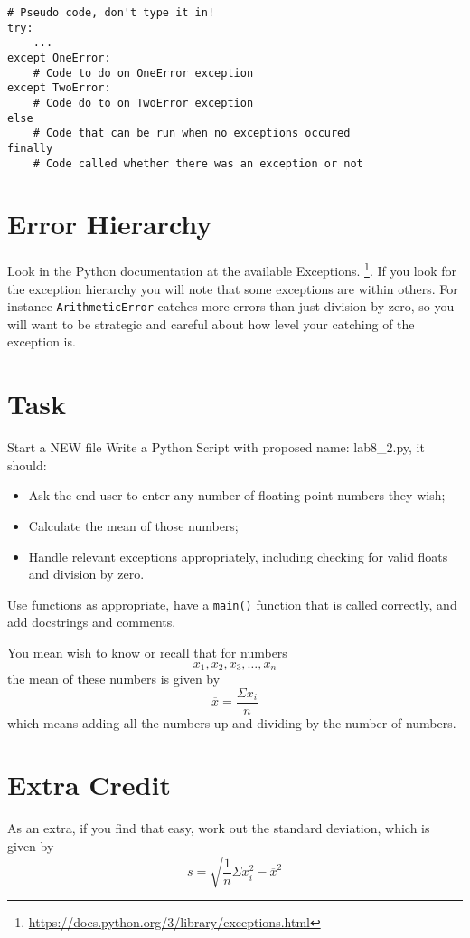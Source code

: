 \documentclass[12pt,oneside]{cttutorial}
\begin{document}
\begin{lstlisting}
# Pseudo code, don't type it in!
try:
    ...    
except OneError:
    # Code to do on OneError exception
except TwoError:
    # Code do to on TwoError exception
else
    # Code that can be run when no exceptions occured
finally
    # Code called whether there was an exception or not
\end{lstlisting}



\section{Error Hierarchy}

Look in the Python documentation at the available Exceptions. \footnote{\url{https://docs.python.org/3/library/exceptions.html}}. If you look for the exception hierarchy you will note that some exceptions are within others. For instance \lstinline!ArithmeticError! catches more errors than just division by zero, so you will want to be strategic and careful about how level your catching of the exception is.

\section{Task}

\alert{Start a NEW file}
Write a Python Script with proposed name: lab8\_2.py, it should:

\begin{itemize}
\item Ask the end user to enter any number of floating point numbers they wish;
\item Calculate the mean of those numbers;
\item Handle relevant exceptions appropriately, including checking for valid floats and division by zero.
\end{itemize}

Use functions as appropriate, have a \lstinline!main()! function that is called correctly, and add docstrings and comments.

You mean wish to know or recall that for numbers
\[
x_1, x_2, x_3, \ldots, x_n
\]
the mean of these numbers is given by
\[
\overline{x}= \frac{\Sigma x_i}{n}
\]
which means adding all the numbers up and dividing by the number of numbers.



\section{Extra Credit}

As an extra, if you find that easy, work out the standard deviation, which is given by
\[
s = \sqrt{\frac{1}{n}\Sigma x_i^2 - \overline{x}^2}
\]
\end{document}
